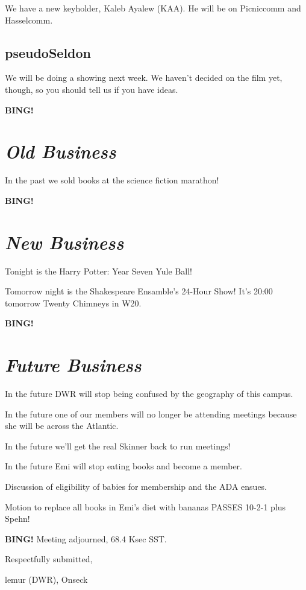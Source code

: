 \documentclass[10pt]{article}
\newcommand{\bing}{{\bf BING!} }
\newcommand{\goto}[1]{\bing \vskip 12pt \section*{{\em{#1}}}}
\newcommand{\ps}{ plus Spehn\xspace}
\newcommand{\onseck}{lemur (DWR), Onseck}
\begin{document}
We have a new keyholder, Kaleb Ayalew (KAA).  He will be on Picniccomm and
Hasselcomm.

\subsection*{pseudoSeldon}

We will be doing a showing next week.  We haven't decided on the film yet,
though, so you should tell us if you have ideas.

\goto{Old Business}

In the past we sold books at the science fiction marathon!

\goto{New Business}

Tonight is the Harry Potter: Year Seven Yule Ball!

Tomorrow night is the Shakespeare Ensamble's 24-Hour Show!  It's
20:00 tomorrow Twenty Chimneys in W20.

\goto{Future Business}

In the future DWR will stop being confused by the geography of this campus.

In the future one of our members will no longer be attending meetings
because she will be across the Atlantic.

In the future we'll get the real Skinner back to run meetings!

In the future Emi will stop eating books and become a member.

Discussion of eligibility of babies for membership and the ADA ensues.

Motion to replace all books in Emi's diet with bananas PASSES 10-2-1\ps!

\bing
\noindent
Meeting adjourned, 68.4 Ksec SST.

\vspace{18pt}

\centerline{Respectfully submitted,}
\centerline{\onseck}
\end{document}
